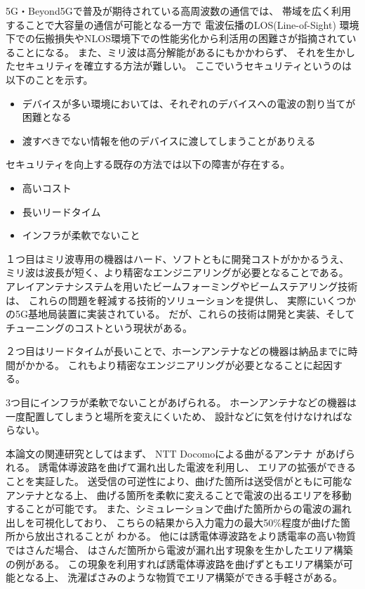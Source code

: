 \documentclass[technicalreport]{ieicej}
\begin{document}
5G・Beyond5Gで普及が期待されている高周波数の通信では、
帯域を広く利用することで大容量の通信が可能となる一方で
電波伝播のLOS(Line-of-Sight)
環境下での伝搬損失やNLOS環境下での性能劣化から利活用の困難さが指摘されていることになる。
また、ミリ波は高分解能があるにもかかわらず、
それを生かしたセキュリティを確立する方法が難しい。
ここでいうセキュリティというのは以下のことを示す。

\begin{itemize}
  \item デバイスが多い環境においては、それぞれのデバイスへの電波の割り当てが困難となる
  \item 渡すべきでない情報を他のデバイスに渡してしまうことがありえる
\end{itemize}

セキュリティを向上する既存の方法では以下の障害が存在する。

\begin{itemize}
  \item 高いコスト
  \item 長いリードタイム
  \item インフラが柔軟でないこと
\end{itemize}

１つ目はミリ波専用の機器はハード、ソフトともに開発コストがかかるうえ、
ミリ波は波長が短く、より精密なエンジニアリングが必要となることである。
アレイアンテナシステムを用いたビームフォーミングやビームステアリング技術は、
これらの問題を軽減する技術的ソリューションを提供し、
実際にいくつかの5G基地局装置に実装されている。
だが、これらの技術は開発と実装、そしてチューニングのコストという現状がある。

２つ目はリードタイムが長いことで、ホーンアンテナなどの機器は納品までに時間がかかる。
これもより精密なエンジニアリングが必要となることに起因する。

3つ目にインフラが柔軟でないことがあげられる。
ホーンアンテナなどの機器は一度配置してしまうと場所を変えにくいため、
設計などに気を付けなければならない。

本論文の関連研究としてはまず、
NTT Docomoによる曲がるアンテナ
\cite{bending_antenna} \cite{leaky_wave_antenna_bent_dielectric}
があげられる。
誘電体導波路を曲げて漏れ出した電波を利用し、
エリアの拡張ができることを実証した。
送受信の可逆性により、曲げた箇所は送受信がともに可能なアンテナとなる上、
曲げる箇所を柔軟に変えることで電波の出るエリアを移動することが可能です。
また、シミュレーションで曲げた箇所からの電波の漏れ出しを可視化しており、
こちらの結果から入力電力の最大50\%程度が曲げた箇所から放出されることが
わかる。
他には誘電体導波路をより誘電率の高い物質ではさんだ場合、
はさんだ箇所から電波が漏れ出す現象を生かしたエリア構築の例がある。
この現象を利用すれば誘電体導波路を曲げずともエリア構築が可能となる上、
洗濯ばさみのような物質でエリア構築ができる手軽さがある。
\end{document}
